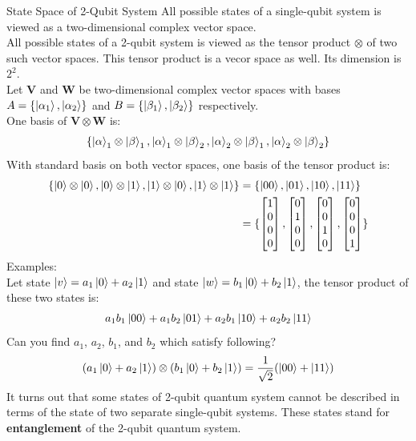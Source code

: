 \documentclass{beamer}
\begin{document}
\begin{frame}{State Space of 2-Qubit System}
  {\tiny
  All possible states of a single-qubit system is viewed as a two-dimensional complex vector space.\\
  All possible states of a 2-qubit system is viewed as the tensor product $\otimes$ of two such vector spaces.
  This tensor product is a vecor space as well. Its dimension is $2^2$.\\
  Let $\mathbf{V}$ and $\mathbf{W}$ be two-dimensional complex vector spaces with
  bases $A=\{\ket{\alpha_1}, \ket{\alpha_2}\}$ and $B=\{\ket{\beta_1}, \ket{\beta_2}\}$ respectively. \\
  One basis of $\mathbf{V} \otimes \mathbf{W}$ is:
  \begin{align*}
    \{\ket\alpha_1 \otimes \ket\beta_1,
       \ket\alpha_1 \otimes \ket\beta_2,
       \ket\alpha_2 \otimes \ket\beta_1,
       \ket\alpha_2 \otimes \ket\beta_2 \}
  \end{align*}
  With standard basis on both vector spaces, one basis of the tensor product is:
  \begin{align*}
    \{\ket0 \otimes \ket0, \ket0 \otimes \ket1, \ket1 \otimes \ket0, \ket1 \otimes \ket1 \}
    &= \{\ket{00}, \ket{01}, \ket{10}, \ket{11} \} \\
    &= \{
      \begin{bmatrix} 1 \\ 0 \\ 0 \\ 0 \end{bmatrix},
      \begin{bmatrix} 0 \\ 1 \\ 0 \\ 0 \end{bmatrix},
      \begin{bmatrix} 0 \\ 0 \\ 1 \\ 0 \end{bmatrix},
      \begin{bmatrix} 0 \\ 0 \\ 0 \\ 1 \end{bmatrix}
    \}
  \end{align*}
  Examples: \\
  Let state $\ket{v}=a_1\ket0 + a_2\ket1$ and state $\ket{w}=b_1\ket0 + b_2\ket1$, the tensor product of these two states is:
  \begin{align*}
  a_1b_1\ket{00} + a_1b_2\ket{01} + a_2b_1\ket{10} + a_2b_2\ket{11}
  \end{align*}
  Can you find $a_1$, $a_2$, $b_1$, and $b_2$ which satisfy following?
  \begin{align*}
  (a_1\ket0 + a_2\ket1) \otimes (b_1\ket0 + b_2\ket1) = \frac{1}{\sqrt2}(\ket{00} + \ket{11})
  \end{align*}
  It turns out that some states of 2-qubit quantum system cannot be described in terms of the state of two separate single-qubit systems.
  These states stand for \textbf{entanglement} of the 2-qubit quantum system.
  }%
\end{frame}
\end{document}
